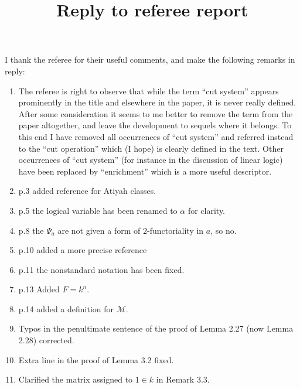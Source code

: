 \documentclass[english,letter paper,12pt,leqno]{article}
\theoremstyle{example}
\numberwithin{equation}{section}
\def\res{\operatorname{Res}}
\begin{document}
\def\Res{\res\!}
\newcommand{\ud}{\mathrm{d}}
\newcommand{\Ress}[1]{\res_{#1}\!}
\newcommand{\cat}[1]{\mathcal{#1}}
\newcommand{\lto}{\longrightarrow}
\newcommand{\xlto}[1]{\stackrel{#1}\lto}
\newcommand{\mf}[1]{\mathfrak{#1}}
\newcommand{\md}[1]{\mathscr{#1}}
\def\sus{\l}
\def\l{\,|\,}
\def\sgn{\textup{sgn}}

\title{Reply to referee report}

I thank the referee for their useful comments, and make the following remarks in reply:

\begin{enumerate}
\item The referee is right to observe that while the term ``cut system'' appears prominently in the title and elsewhere in the paper, it is never really defined. After some consideration it seems to me better to remove the term from the paper altogether, and leave the development to sequels where it belongs. To this end I have removed all occurrences of ``cut system'' and referred instead to the ``cut operation'' which (I hope) is clearly defined in the text. Other occurrences of ``cut system'' (for instance in the discussion of linear logic) have been replaced by ``enrichment'' which is a more useful descriptor.

\item p.3 added reference for Atiyah classes.

\item p.5 the logical variable has been renamed to $\alpha$ for clarity.

\item p.8 the $\Psi_a$ are not given a form of $2$-functoriality in $a$, so no.

\item p.10 added a more precise reference

\item p.11 the nonstandard notation has been fixed.

\item p.13 Added $F = k^n$.

\item p.14 added a definition for $\cat{M}$.

\item Typos in the penultimate sentence of the proof of Lemma 2.27 (now Lemma 2.28) corrected.

\item Extra line in the proof of Lemma 3.2 fixed.

\item Clarified the matrix assigned to $1 \in k$ in Remark 3.3.


\end{enumerate}
\end{document}
